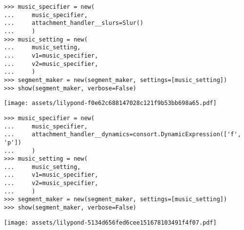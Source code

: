 \begin{comment}
<abjad>[stylesheet=../consort.ily]
music_specifier = new(
    music_specifier,
    attachment_handler__slurs=Slur()
    )
music_setting = new(
    music_setting,
    v1=music_specifier,
    v2=music_specifier,
    )
segment_maker = new(segment_maker, settings=[music_setting])
show(segment_maker, verbose=False)
</abjad>
\end{comment}

\begin{abjadbookoutput}
\begin{singlespacing}
\vspace{-0.5\baselineskip}
\begin{lstlisting}
>>> music_specifier = new(
...     music_specifier,
...     attachment_handler__slurs=Slur()
...     )
>>> music_setting = new(
...     music_setting,
...     v1=music_specifier,
...     v2=music_specifier,
...     )
>>> segment_maker = new(segment_maker, settings=[music_setting])
>>> show(segment_maker, verbose=False)
\end{lstlisting}
\noindent\texttt{[image: assets/lilypond-f0e62c688147028c121f9b53bb698a65.pdf]}
\end{singlespacing}
\end{abjadbookoutput}

\begin{comment}
<abjad>[stylesheet=../consort.ily]
music_specifier = new(
    music_specifier,
    attachment_handler__dynamics=consort.DynamicExpression(['f', 'p'])
    )
music_setting = new(
    music_setting,
    v1=music_specifier,
    v2=music_specifier,
    )
segment_maker = new(segment_maker, settings=[music_setting])
show(segment_maker, verbose=False)
</abjad>
\end{comment}

\begin{abjadbookoutput}
\begin{singlespacing}
\vspace{-0.5\baselineskip}
\begin{lstlisting}
>>> music_specifier = new(
...     music_specifier,
...     attachment_handler__dynamics=consort.DynamicExpression(['f', 'p'])
...     )
>>> music_setting = new(
...     music_setting,
...     v1=music_specifier,
...     v2=music_specifier,
...     )
>>> segment_maker = new(segment_maker, settings=[music_setting])
>>> show(segment_maker, verbose=False)
\end{lstlisting}
\noindent\texttt{[image: assets/lilypond-5134d656fed6cee151678103491f4f07.pdf]}
\end{singlespacing}
\end{abjadbookoutput}


